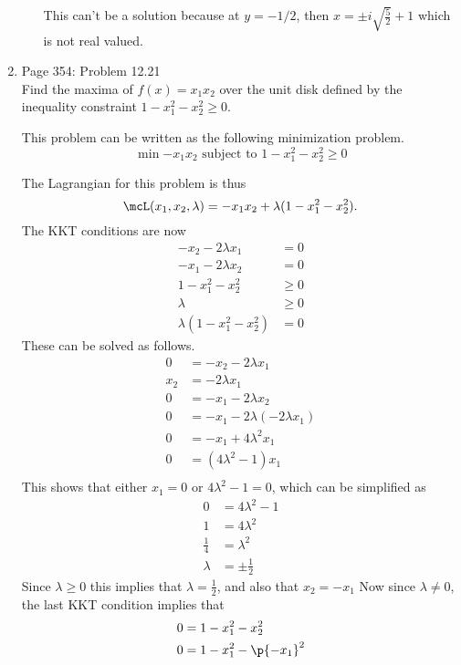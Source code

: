 \documentclass[11pt, oneside]{article}
\begin{document}
\begin{enumerate}
\begin{enumerate}
        This can't be a solution because at $y = -1/2$, then
        $x = \pm i \sqrt{\frac{5}{2}} + 1$ which is not real valued.
    \end{enumerate}

  \item %
    Page 354: Problem 12.21 \\
    Find the maxima of $f(x) = x_1 x_2$ over the unit disk defined by the
    inequality constraint $1 - x_1^2 - x_2^2 \ge 0$.

    This problem can be written as the following minimization problem.
    \[
      \min{-x_1 x_2} \text{ subject to } 1 - x_1^2 - x_2^2 \ge 0
    \]

    The Lagrangian for this problem is thus
    \[
      \mcL(x_1, x_2, \lambda) = -x_1 x_2 + \lambda (1 - x_1^2 - x_2^2).
    \]
    The KKT conditions are now
    \begin{align*}
      -x_2 - 2\lambda x_1 &= 0 \\
      -x_1 - 2\lambda x_2 &= 0 \\
      1 - x_1^2 - x_2^2 &\ge 0 \\
      \lambda &\ge 0 \\
      \lambda (1 - x_1^2 - x_2^2) &= 0
    \end{align*}
    These can be solved as follows.
    \begin{align*}
      0 &= -x_2 - 2\lambda x_1 \\
      x_2 &= -2\lambda x_1 \\
      0 &= -x_1 - 2\lambda x_2 \\
      0 &= -x_1 - 2\lambda (-2\lambda x_1) \\
      0 &= -x_1 + 4\lambda^2 x_1 \\
      0 &= (4\lambda^2 - 1) x_1 \\
    \end{align*}
    This shows that either $x_1 = 0$ or $4\lambda^2 - 1 = 0$, which can be
    simplified as
    \begin{align*}
      0 &= 4\lambda^2 - 1 \\
      1 &= 4\lambda^2 \\
      \frac{1}{4} &= \lambda^2 \\
      \lambda &= \pm \frac{1}{2}
    \end{align*}
    Since $\lambda \ge 0$ this implies that $\lambda = \frac{1}{2}$, and also
    that $x_2 = -x_1$
    Now since $\lambda \neq 0$, the last KKT condition implies that
    \begin{align*}
      0 &= 1 - x_1^2 - x_2^2 \\
      0 &= 1 - x_1^2 - \p{-x_1}^2 \\
    \end{align*}


\end{enumerate}
\end{document}
